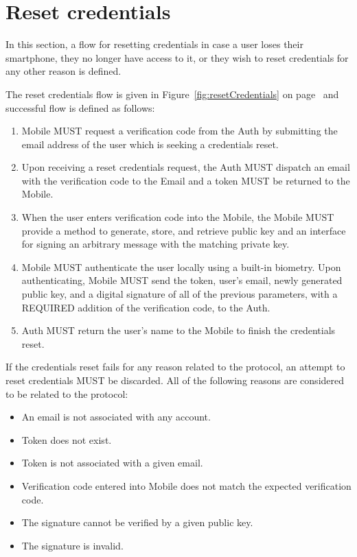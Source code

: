 \section{Reset credentials}
In this section, a flow for resetting credentials in case a user loses their smartphone, they no longer have access to it,
or they wish to reset credentials for any other reason is defined.
\medskip

The reset credentials flow is given in Figure~\ref{fig:resetCredentials} on page~\pageref{fig:resetCredentials} 
and successful flow is defined as follows:
    \begin{enumerate}
        \item Mobile MUST request a verification code from the Auth by submitting the email address of the user
              which is seeking a credentials reset.
        \item Upon receiving a reset credentials request, the Auth MUST dispatch an email with the verification
              code to the Email and a token MUST be returned to the Mobile.
        \item When the user enters verification code into the Mobile, the Mobile MUST provide a method to generate,
              store, and retrieve public key and an interface for signing an arbitrary message with the matching 
              private key.
        \item Mobile MUST authenticate the user locally using a built-in biometry. Upon authenticating, Mobile 
              MUST send the token, user's email, newly generated public key, and a digital signature of all of the 
              previous parameters, with a REQUIRED addition of the verification code, to the Auth.
        \item Auth MUST return the user's name to the Mobile to finish the credentials reset.
    \end{enumerate}
    
If the credentials reset fails for any reason related to the protocol, an attempt to reset credentials MUST 
be discarded. All of the following reasons are considered to be related to the protocol:
    \begin{itemize}
        \item An email is not associated with any account.
        \item Token does not exist.
        \item Token is not associated with a given email.
        \item Verification code entered into Mobile does not match the expected verification code.
        \item The signature cannot be verified by a given public key.
        \item The signature is invalid.
    \end{itemize}
